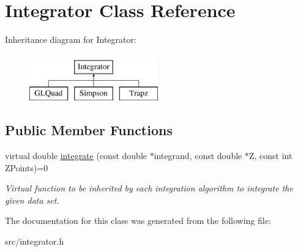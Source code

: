 \hypertarget{classIntegrator}{
\section{Integrator Class Reference}
\label{da/d05/classIntegrator}
}
Inheritance diagram for Integrator:\begin{figure}[H]
\begin{center}
\leavevmode
\includegraphics[height=2cm]{da/d05/classIntegrator}
\end{center}
\end{figure}
\subsection*{Public Member Functions}
\begin{DoxyCompactItemize}
\item 
\hypertarget{classIntegrator_a89fbef2f7923ce4e2c979b2ff1d1f4ac}{
virtual double \hyperlink{classIntegrator_a89fbef2f7923ce4e2c979b2ff1d1f4ac}{integrate} (const double $\ast$integrand, const double $\ast$Z, const int ZPoints)=0}
\label{da/d05/classIntegrator_a89fbef2f7923ce4e2c979b2ff1d1f4ac}

\begin{DoxyCompactList}\small\item\em Virtual function to be inherited by each integration algorithm to integrate the given data set. \item\end{DoxyCompactList}\end{DoxyCompactItemize}


The documentation for this class was generated from the following file:\begin{DoxyCompactItemize}
\item 
src/integrator.h\end{DoxyCompactItemize}
